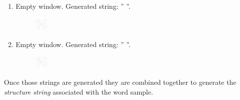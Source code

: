 \begin{enumerate}[label=(\alph*)]
\begin{figure}[!htpb]
\end{figure} 
\item Empty window. Generated string: ''\emph{ }''.
\begin{figure}[!htpb]
\centering
\includegraphics[width=0.06\textwidth]{images/missouri/11.png}
\end{figure} 
\item Empty window. Generated string: ''\emph{ }''.
\begin{figure}[!htpb]
\centering
\includegraphics[width=0.06\textwidth]{images/missouri/12.png}
\end{figure} 
\end{enumerate}

Once those strings are generated they are combined together to generate the \textit{structure string} associated with the word sample. 

